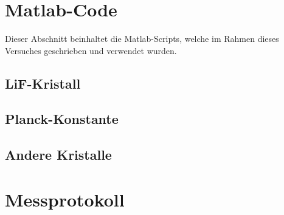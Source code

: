 \section{Matlab-Code}

Dieser  Abschnitt  beinhaltet  die  Matlab-Scripts, welche  im  Rahmen  dieses
Versuches geschrieben und verwendet wurden.

\subsection{LiF-Kristall}
\label{app:subsec:LiF}


\clearpage
\subsection{Planck-Konstante}
\label{app:subsec:planck}



\clearpage
\subsection{Andere Kristalle}
\label{app:subsec:others}


\clearpage
\section{Messprotokoll}
\label{app:protocols}

